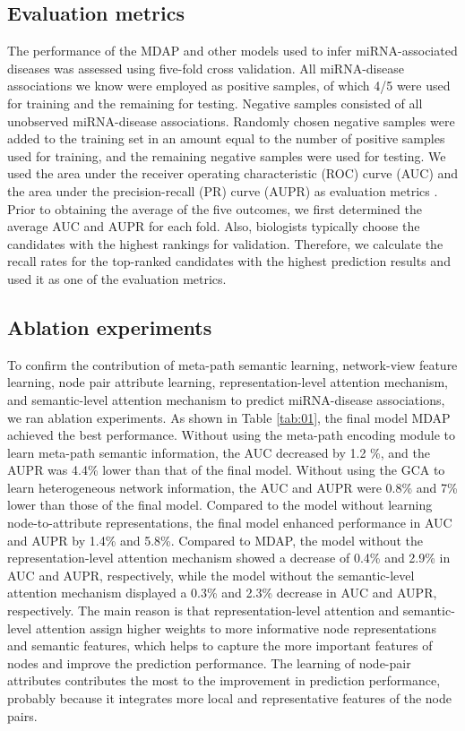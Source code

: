 \documentclass[journal,twoside,web]{ieeecolor}
\begin{document}
\subsection{Evaluation metrics}

The performance of the MDAP and other models used to infer miRNA-associated diseases was assessed using five-fold cross validation. All miRNA-disease associations we know were employed as positive samples, of which 4/5 were used for training and the remaining for testing. Negative samples consisted of all unobserved miRNA-disease associations. Randomly chosen negative samples were added to the training set in an amount equal to the number of positive samples used for training, and the remaining negative samples were used for testing. We used the area under the receiver operating characteristic (ROC) curve (AUC) \cite{0Integration,hajian2013receiver} and the area under the precision-recall (PR) curve (AUPR) as evaluation metrics \cite{saito2015precision}. Prior to obtaining the average of the five outcomes, we first determined the average AUC and AUPR for each fold. Also, biologists typically choose the candidates with the highest rankings for validation. Therefore, we calculate the recall rates for the top-ranked candidates with the highest prediction results and used it as one of the evaluation metrics. 

\subsection{Ablation experiments}

To confirm the contribution of meta-path semantic learning, network-view feature learning, node pair attribute learning, representation-level attention mechanism, and semantic-level attention mechanism to predict miRNA-disease associations, we ran ablation experiments. As shown in Table \ref{tab:01}, the final model MDAP achieved the best performance. Without using the meta-path encoding module to learn meta-path semantic information, the AUC decreased by 1.2 \%, and the AUPR was 4.4\% lower than that of the final model. Without using the GCA to learn heterogeneous network information, the AUC and AUPR were 0.8\% and 7\% lower than those of the final model. Compared to the model without learning node-to-attribute representations, the final model enhanced performance in AUC and AUPR by 1.4\% and 5.8\%. Compared to MDAP, the model without the representation-level attention mechanism showed a decrease of 0.4\% and 2.9\% in AUC and AUPR, respectively, while the model without the semantic-level attention mechanism displayed a 0.3\% and 2.3\% decrease in AUC and AUPR, respectively. The main reason is that representation-level attention and semantic-level attention assign higher weights to more informative node representations and semantic features, which helps to capture the more important features of nodes and improve the prediction performance. The learning of node-pair attributes contributes the most to the improvement in prediction performance, probably because it integrates more local and representative features of the node pairs.
\end{document}
